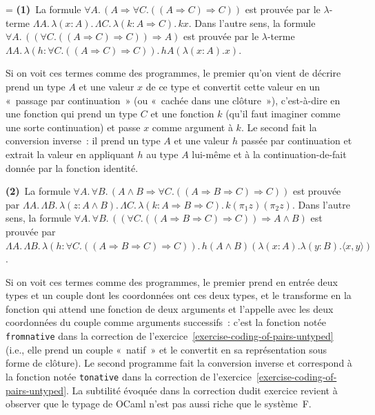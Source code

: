 \documentclass[12pt,a4paper]{article}
\theoremstyle{definition}
\newif\ifcorrige
\newenvironment{corrige}%
{\ifcorrige\relax\else\setbox0=\vbox\bgroup\fi%
\smallbreak\footnotesize\noindent{\underbar{\textit{Corrigé.}}\quad}}
{{\hbox{}\nobreak\hfill\checkmark}%
\ifcorrige\relax\else\egroup\fi\par}
\begin{document}
\begin{corrige}
\textbf{(1)} La formule $\forall A.\,(A \Rightarrow \forall
C.((A\Rightarrow C)\Rightarrow C))$ est prouvée par le $\lambda$-terme
$\Lambda A.\, \lambda(x:A).\, \Lambda C.\, \lambda(k:A\Rightarrow
C).\, kx$.  Dans l'autre sens, la formule $\forall A.\,((\forall
C.((A\Rightarrow C)\Rightarrow C)) \Rightarrow A)$ est prouvée par le
$\lambda$-terme $\Lambda A.\, \lambda(h:\forall C.((A\Rightarrow
C)\Rightarrow C)).\, hA(\lambda(x:A).x)$.

Si on voit ces termes comme des programmes, le premier qu'on vient de
décrire prend un type $A$ et une valeur $x$ de ce type et convertit
cette valeur en un « passage par continuation » (ou « cachée dans une
clôture »), c'est-à-dire en une fonction qui prend un type $C$ et une
fonction $k$ (qu'il faut imaginer comme une sorte continuation) et
passe $x$ comme argument à $k$.  Le second fait la conversion
inverse : il prend un type $A$ et une valeur $h$ passée par
continuation et extrait la valeur en appliquant $h$ au type $A$
lui-même et à la continuation-de-fait donnée par la fonction identité.

\textbf{(2)} La formule $\forall A.\,\forall B.\,(A\land B \Rightarrow
\forall C.((A\Rightarrow B\Rightarrow C)\Rightarrow C))$ est prouvée
par $\Lambda A.\, \Lambda B.\, \lambda(z:A\land B).\, \Lambda C.\,
\lambda(k:A\Rightarrow B\Rightarrow C).\, k(\pi_1 z)(\pi_2 z)$.  Dans
l'autre sens, la formule $\forall A.\,\forall B.\,((\forall
C.((A\Rightarrow B\Rightarrow C)\Rightarrow C)) \Rightarrow A\land B)$
est prouvée par $\Lambda A.\, \Lambda B.\, \lambda(h:\forall
C.((A\Rightarrow B\Rightarrow C)\Rightarrow C)).\, h(A\land
B)(\lambda(x:A).\lambda(y:B).\langle x,y\rangle)$.

Si on voit ces termes comme des programmes, le premier prend en entrée
deux types et un couple dont les coordonnées ont ces deux types, et le
transforme en la fonction qui attend une fonction de deux arguments et
l'appelle avec les deux coordonnées du couple comme arguments
successifs : c'est la fonction notée \texttt{fromnative} dans la
correction de l'exercice \ref{exercise-coding-of-pairs-untyped} (i.e.,
elle prend un couple « natif » et le convertit en sa représentation
sous forme de clôture).  Le second programme fait la conversion
inverse et correspond à la fonction notée \texttt{tonative} dans la
correction de l'exercice \ref{exercise-coding-of-pairs-untyped}.  La
subtilité évoquée dans la correction dudit exercice revient à observer
que le typage de OCaml n'est pas aussi riche que le système F.


\end{corrige}
\end{document}
